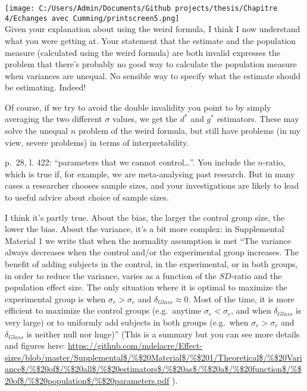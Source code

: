 \documentclass[
  12pt,
  french,
]{article}
\begin{document}
\texttt{[image: C:/Users/Admin/Documents/Github projects/thesis/Chapitre 4/Echanges avec Cumming/printscreen5.png]}\\
\color{brown} Given your explanation about using the weird formula, I
think I now understand what you were getting at. Your statement that the
estimate and the population measure (calculated using the weird formula)
are both invalid expresses the problem that there's probably no good way
to calculate the population measure when variances are unequal. No
sensible way to specify what the estimate should be estimating. Indeed!

Of course, if we try to avoid the double invalidity you point to by
simply averaging the two different \(\sigma\) values, we get the \(d^*\)
and \(g^*\) estimators. These may solve the unequal \(n\) problem of the
weird formula, but still have problems (in my view, severe problems) in
terms of interpretability.

\color{black} p.~28, l. 422: ``parameters that we cannot
control\ldots{}''. You include the \(n\)-ratio, which is true if, for
example, we are meta-analysing past research. But in many cases a
researcher chooses sample sizes, and your investigations are likely to
lead to useful advice about choice of sample sizes.

\color{blue} I think it's partly true. About the bias, the larger the
control group size, the lower the bias. About the variance, it's a bit
more complex: in Supplemental Material 1 we write that when the
normality assumption is met ``The variance always decreases when the
control and/or the experimental group increases. The benefit of adding
subjects in the control, in the experimental, or in both groups, in
order to reduce the variance, varies as a function of the \(SD\)-ratio
and the population effect size. The only situation where it is optimal
to maximize the experimental group is when \(\sigma_e>\sigma_c\) and
\(\delta_{Glass}\approx 0\). Most of the time, it is more efficient to
maximize the control groups (e.g.~anytime \(\sigma_e<\sigma_c\), and
when \(\delta_{Glass}\) is very large) or to uniformly add subjects in
both groups (e.g.~when \(\sigma_e>\sigma_c\) and \(\delta_{Glass}\) is
neither null nor huge)'' (This is a summary but you can see more details
and figures here:
\url{https://github.com/mdelacre/Effect-sizes/blob/master/Supplemental$/\%$20Material$/\%$201/Theoretical$/\%$20Variance$/\%$20of$/\%$20all$/\%$20estimators$/\%$20as$/\%$20a$/\%$20function$/\%$20of$/\%$20population$/\%$20parameters.pdf}
).
\end{document}
